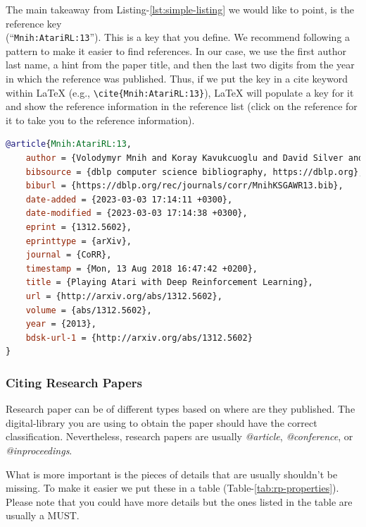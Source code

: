 The main takeaway from Listing-\ref{lst:simple-listing} we would like to point, is the reference key\\(``\texttt{Mnih:AtariRL:13}''). This is a key that you define. We recommend following a pattern to make it easier to find references. In our case, we use the first author last name, a hint from the paper title, and then the last two digits from the year in which the reference was published. Thus, if we put the key in a cite keyword within {\LaTeX} (e.g., \verb|\cite{Mnih:AtariRL:13}|), {\LaTeX} will populate a key for it and show the reference information in the reference list \cite{Mnih:AtariRL:13} (click on the reference for it to take you to the reference information). 

\begin{lstlisting}[language=BibTex,style=mystyle,caption={Sample BibTex Reference Entry},label={lst:simple-listing}]
@article{Mnih:AtariRL:13,
    author = {Volodymyr Mnih and Koray Kavukcuoglu and David Silver and Alex Graves and Ioannis Antonoglou and Daan Wierstra and Martin A. Riedmiller},
    bibsource = {dblp computer science bibliography, https://dblp.org},
    biburl = {https://dblp.org/rec/journals/corr/MnihKSGAWR13.bib},
    date-added = {2023-03-03 17:14:11 +0300},
    date-modified = {2023-03-03 17:14:38 +0300},
    eprint = {1312.5602},
    eprinttype = {arXiv},
    journal = {CoRR},
    timestamp = {Mon, 13 Aug 2018 16:47:42 +0200},
    title = {Playing Atari with Deep Reinforcement Learning},
    url = {http://arxiv.org/abs/1312.5602},
    volume = {abs/1312.5602},
    year = {2013},
    bdsk-url-1 = {http://arxiv.org/abs/1312.5602}
}
\end{lstlisting}

\subsubsection{Citing Research Papers}

Research paper can be of different types based on where are they published. The digital-library you are using to obtain the paper should have the correct classification. Nevertheless, research papers are usually \emph{@article}, \emph{@conference}, or \emph{@inproceedings}. 

What is more important is the pieces of details that are usually shouldn't be missing. To make it easier we put these in a table (Table-\ref{tab:rp-properties}). Please note that you could have more details but the ones listed in the table are usually a MUST.

